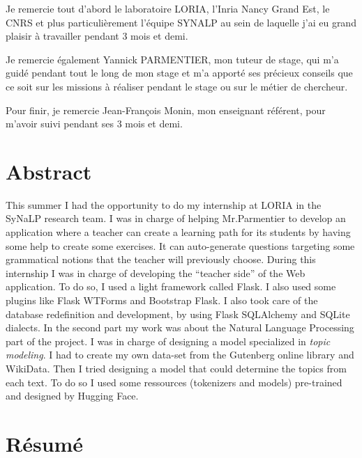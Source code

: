 \documentclass[12pt]{article}
\begin{document}
Je remercie tout d'abord le laboratoire LORIA, l'Inria Nancy Grand Est, le CNRS et plus particulièrement l'équipe SYNALP au sein de laquelle j'ai eu grand plaisir à travailler pendant 3 mois et demi. 

Je remercie également Yannick PARMENTIER, mon tuteur de stage, qui m’a guidé pendant tout le long de mon stage et m’a apporté ses précieux conseils que ce soit sur les missions à réaliser pendant le stage ou sur le métier de chercheur. 

Pour finir, je remercie Jean-François Monin, mon enseignant référent, pour m’avoir suivi pendant ses 3 mois et demi. 


\newpage

\section*{Abstract}

This summer I had the opportunity to do my internship at LORIA in the SyNaLP research team. I was in charge of helping Mr.Parmentier to develop an application where a teacher can create a learning path for its students by having some help to create some exercises. It can auto-generate questions targeting some grammatical notions that the teacher will previously choose. 
During this internship I was in charge of developing the “teacher side” of the Web application. To do so, I used a light framework called Flask. I also used some plugins like Flask WTForms and Bootstrap Flask. I also took care of the database redefinition and development, by using Flask SQLAlchemy and SQLite dialects.  
In the second part my work was about the Natural Language Processing part of the project. I was in charge of designing a model specialized in \textit{topic modeling}. I had to create my own data-set from the Gutenberg online library and WikiData. Then I tried designing a model that could determine the topics from each text. To do so I used some ressources (tokenizers and models) pre-trained and designed by Hugging Face. 

\section*{Résumé}
\end{document}
